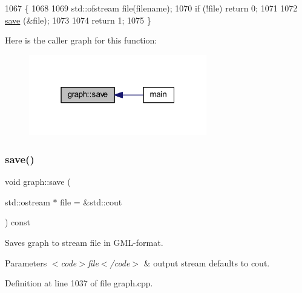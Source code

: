 \begin{DoxyCode}
1067                                            \{
1068     
1069     std::ofstream file(filename);
1070     \textcolor{keywordflow}{if} (!file) \textcolor{keywordflow}{return} 0;
1071     
1072     \mbox{\hyperlink{classgraph_a7bd0712a528249d1585085a64ac3e661}{save}} (&file);
1073 
1074     \textcolor{keywordflow}{return} 1;
1075 \}
\end{DoxyCode}
Here is the caller graph for this function\+:
\nopagebreak
\begin{figure}[H]
\begin{center}
\leavevmode
\includegraphics[width=220pt]{classgraph_a7bd0712a528249d1585085a64ac3e661_icgraph}
\end{center}
\end{figure}
\mbox{\label{classgraph_ad53bd0f3c96616b7f2d44abdce3df6de}} 
\subsubsection{\texorpdfstring{save()}{save()}\hspace{0.1cm}{\footnotesize\ttfamily [2/2]}}
{\footnotesize\ttfamily void graph\+::save (\begin{DoxyParamCaption}\item[{std\+::ostream $\ast$}]{file = {\ttfamily \&std\+:\+:cout} }\end{DoxyParamCaption}) const\hspace{0.3cm}{\ttfamily [inherited]}}

Saves graph to stream {\ttfamily file} in G\+M\+L-\/format.


\begin{DoxyParams}{Parameters}
{\em $<$code$>$file$<$/code$>$} & output stream defaults to cout. \\
\hline
\end{DoxyParams}


Definition at line 1037 of file graph.\+cpp.


